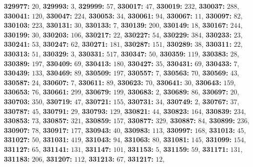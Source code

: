 \textsf{\bfseries 329977:} $20$, \textsf{\bfseries 329993:} $3$, \textsf{\bfseries 329999:} $57$, \textsf{\bfseries 330017:} $47$, \textsf{\bfseries 330019:} $232$, \textsf{\bfseries 330037:} $288$, \textsf{\bfseries 330041:} $120$, \textsf{\bfseries 330047:} $224$, \textsf{\bfseries 330053:} $34$, \textsf{\bfseries 330061:} $94$, \textsf{\bfseries 330067:} $11$, \textsf{\bfseries 330097:} $82$, \textsf{\bfseries 330103:} $223$, \textsf{\bfseries 330131:} $30$, \textsf{\bfseries 330133:} $7$, \textsf{\bfseries 330139:} $200$, \textsf{\bfseries 330149:} $18$, \textsf{\bfseries 330167:} $244$, \textsf{\bfseries 330199:} $30$, \textsf{\bfseries 330203:} $106$, \textsf{\bfseries 330217:} $22$, \textsf{\bfseries 330227:} $54$, \textsf{\bfseries 330229:} $384$, \textsf{\bfseries 330233:} $23$, \textsf{\bfseries 330241:} $53$, \textsf{\bfseries 330247:} $62$, \textsf{\bfseries 330271:} $181$, \textsf{\bfseries 330287:} $151$, \textsf{\bfseries 330289:} $38$, \textsf{\bfseries 330311:} $22$, \textsf{\bfseries 330313:} $51$, \textsf{\bfseries 330329:} $3$, \textsf{\bfseries 330331:} $517$, \textsf{\bfseries 330347:} $50$, \textsf{\bfseries 330359:} $119$, \textsf{\bfseries 330383:} $28$, \textsf{\bfseries 330389:} $197$, \textsf{\bfseries 330409:} $69$, \textsf{\bfseries 330413:} $180$, \textsf{\bfseries 330427:} $35$, \textsf{\bfseries 330431:} $69$, \textsf{\bfseries 330433:} $7$, \textsf{\bfseries 330439:} $133$, \textsf{\bfseries 330469:} $89$, \textsf{\bfseries 330509:} $197$, \textsf{\bfseries 330557:} $7$, \textsf{\bfseries 330563:} $70$, \textsf{\bfseries 330569:} $43$, \textsf{\bfseries 330587:} $24$, \textsf{\bfseries 330607:} $7$, \textsf{\bfseries 330611:} $89$, \textsf{\bfseries 330623:} $70$, \textsf{\bfseries 330641:} $30$, \textsf{\bfseries 330643:} $159$, \textsf{\bfseries 330653:} $76$, \textsf{\bfseries 330661:} $299$, \textsf{\bfseries 330679:} $199$, \textsf{\bfseries 330683:} $2$, \textsf{\bfseries 330689:} $86$, \textsf{\bfseries 330697:} $20$, \textsf{\bfseries 330703:} $350$, \textsf{\bfseries 330719:} $47$, \textsf{\bfseries 330721:} $155$, \textsf{\bfseries 330731:} $34$, \textsf{\bfseries 330749:} $2$, \textsf{\bfseries 330767:} $37$, \textsf{\bfseries 330787:} $45$, \textsf{\bfseries 330791:} $29$, \textsf{\bfseries 330793:} $129$, \textsf{\bfseries 330821:} $44$, \textsf{\bfseries 330823:} $164$, \textsf{\bfseries 330839:} $234$, \textsf{\bfseries 330853:} $73$, \textsf{\bfseries 330857:} $321$, \textsf{\bfseries 330859:} $157$, \textsf{\bfseries 330877:} $329$, \textsf{\bfseries 330887:} $84$, \textsf{\bfseries 330899:} $236$, \textsf{\bfseries 330907:} $78$, \textsf{\bfseries 330917:} $177$, \textsf{\bfseries 330943:} $40$, \textsf{\bfseries 330983:} $113$, \textsf{\bfseries 330997:} $168$, \textsf{\bfseries 331013:} $45$, \textsf{\bfseries 331027:} $50$, \textsf{\bfseries 331031:} $419$, \textsf{\bfseries 331043:} $94$, \textsf{\bfseries 331063:} $80$, \textsf{\bfseries 331081:} $145$, \textsf{\bfseries 331099:} $154$, \textsf{\bfseries 331127:} $65$, \textsf{\bfseries 331141:} $131$, \textsf{\bfseries 331147:} $101$, \textsf{\bfseries 331153:} $5$, \textsf{\bfseries 331159:} $59$, \textsf{\bfseries 331171:} $131$, \textsf{\bfseries 331183:} $206$, \textsf{\bfseries 331207:} $112$, \textsf{\bfseries 331213:} $67$, \textsf{\bfseries 331217:} $12$, 
